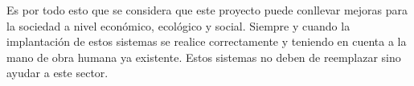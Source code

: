 Es por todo esto que se considera que este proyecto puede conllevar mejoras para la sociedad a nivel económico, ecológico y social. Siempre y cuando la implantación de estos sistemas se realice correctamente y teniendo en cuenta a la mano de obra humana ya existente. Estos sistemas no deben de reemplazar sino ayudar a este sector.